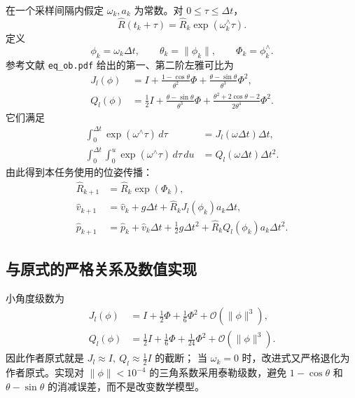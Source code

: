 \documentclass[11pt,a4paper]{ctexart}
\begin{document}
在一个采样间隔内假定 $\omega_k,a_k$ 为常数。对
$0\leq\tau\leq\Delta t$，
\begin{equation}
 \hat R(t_k+\tau)
 =\hat R_k\exp(\omega_k^\wedge\tau).
\end{equation}
定义
\begin{equation}
 \phi_k=\omega_k\Delta t,\qquad
 \theta_k=\|\phi_k\|,\qquad
 \Phi_k=\phi_k^\wedge .
\end{equation}
参考文献 \texttt{eq\_ob.pdf} 给出的第一、第二阶左雅可比为
\begin{align}
 J_l(\phi)
 &=I+\frac{1-\cos\theta}{\theta^2}\Phi
 +\frac{\theta-\sin\theta}{\theta^3}\Phi^2,\\
 Q_l(\phi)
 &=\frac12I+\frac{\theta-\sin\theta}{\theta^3}\Phi
 +\frac{\theta^2+2\cos\theta-2}{2\theta^4}\Phi^2.
\end{align}
它们满足
\begin{align}
 \int_0^{\Delta t}\exp(\omega^\wedge\tau)\,d\tau
 &=J_l(\omega\Delta t)\Delta t,\\
 \int_0^{\Delta t}\int_0^u
 \exp(\omega^\wedge\tau)\,d\tau\,du
 &=Q_l(\omega\Delta t)\Delta t^2.
\end{align}
由此得到本任务使用的位姿传播：
\begin{equation}
\boxed{
\begin{aligned}
 \hat R_{k+1}
 &=\hat R_k\exp(\Phi_k),\\
 \hat v_{k+1}
 &=\hat v_k+g\Delta t
 +\hat R_kJ_l(\phi_k)a_k\Delta t,\\
 \hat p_{k+1}
 &=\hat p_k+\hat v_k\Delta t+\frac12g\Delta t^2
 +\hat R_kQ_l(\phi_k)a_k\Delta t^2.
\end{aligned}}
\label{eq:improved}
\end{equation}

\subsection{与原式的严格关系及数值实现}

小角度级数为
\begin{align}
 J_l(\phi)
 &=I+\frac12\Phi+\frac16\Phi^2+\mathcal O(\|\phi\|^3),\\
 Q_l(\phi)
 &=\frac12I+\frac16\Phi+\frac1{24}\Phi^2
 +\mathcal O(\|\phi\|^3).
\end{align}
因此作者原式就是 $J_l\approx I,\ Q_l\approx\tfrac12I$ 的截断；
当 $\omega_k=0$ 时，改进式又严格退化为作者原式。实现对
$\|\phi\|<10^{-4}$ 的三角系数采用泰勒级数，避免
$1-\cos\theta$ 和 $\theta-\sin\theta$ 的消减误差，而不是改变数学模型。
\end{document}
